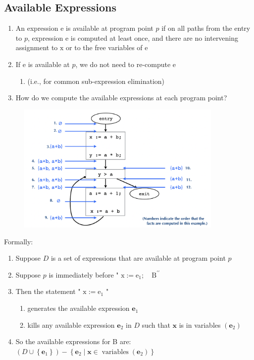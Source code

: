 \documentclass[a4paper]{article}
\theoremstyle{definition}
\begin{document}
 \subsection{Available Expressions}
 \begin{enumerate}
     \item An expression e is available at program point $p$ if on all paths from the entry to $p$, expression e is computed at least once, and there are no intervening  assignment to $\mathrm{x}$ or to the free variables of $\mathrm{e}$
     \item If e is available at $p$, we do not need to re-compute e
     
\begin{enumerate}
    \item (i.e., for common sub-expression elimination)
\end{enumerate}
\item How do we compute the available expressions at each program point?
 \end{enumerate}
 \begin{figure}[htbp]
  \centering
  \includegraphics[width=10cm]{./img/avail.png}
\end{figure}
Formally:
\begin{enumerate}
    \item Suppose $D$ is a set of expressions that are available at program point $p$
\item Suppose $p$ is immediately before " $\mathrm{x}:=\mathrm{e}_{1} ; \quad \mathrm{B}^{\prime \prime}$
\item Then the statement " $\mathrm{x}:=\mathrm{e}_{1}$ "
\begin{enumerate}
    \item generates the available expression $\mathbf{e}_{1}$
    \item kills any available expression $\mathbf{e}_{2}$ in $D$ such that $\mathbf{x}$ is in variables $\left(\mathbf{e}_{2}\right)$
    
\end{enumerate}
\item So the available expressions for B are: $\left(D \cup\left\{\mathbf{e}_{1}\right\}\right)-\left\{\mathbf{e}_{2} \mid \mathbf{x} \in \operatorname{variables}\left(\mathbf{e}_{2}\right)\right\}$
\end{enumerate}
\end{document}

